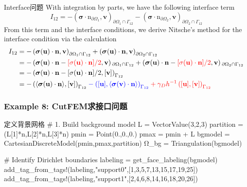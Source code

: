\documentclass[lang=en,aspectratio=43,theme=default,logo=on]{simplebeamer}
\begin{document}
\begin{frame}{Interface问题}
With integration by parts, we have the following interface term
\begin{equation*}
I_{12}=-\left( \bm{\sigma} \cdot \mathrm{n}_{\partial \Omega_1}, \mathbf{v} \right)_{\partial \Omega_1 \cap \Gamma_{12}} - \left( \bm{\sigma} \cdot \mathrm{n}_{\partial \Omega_2}, \mathbf{v} \right)_{\partial \Omega_2 \cap \Gamma_{12}}
\end{equation*}
From this term and the interface conditions, we derive Nitsche’s method for
the interface condition via the calculation
\begin{align*}
    I_{12} &= -\left( \boldsymbol{\sigma}(\mathbf{u}) \cdot \mathbf{n}, \mathbf{v} \right)_{\partial \Omega_1 \cap \Gamma_{12}} + \left( \boldsymbol{\sigma} (\mathbf{u}) \cdot \mathbf{n}, \mathbf{v} \right)_{\partial \Omega_2 \cap \Gamma_{12}}\\
    &= -\left( \boldsymbol{\sigma} (\mathbf{u}) \cdot \mathbf{n} - \color{red}[\sigma(\mathbf{u})\cdot \mathbf{n}]/2 \color{black}, \mathbf{v} \right)_{\partial \Omega_1 \cap \Gamma_{12}} + \left( \boldsymbol{\sigma} (\mathbf{u}) \cdot \mathbf{n} - \color{red} [\sigma(\mathbf{u})\cdot \mathbf{n}]/2 \color{black}, \mathbf{v} \right)_{\partial \Omega_2 \cap \Gamma_{12}}\\
    &=-\left( \boldsymbol{\sigma} (\mathbf{u}) \cdot \mathbf{n} - [\sigma(\mathbf{u})\cdot \mathbf{n}]/2, [\mathbf{v}] \right)_{\Gamma_{12}}\\
    &=-\left( \langle \boldsymbol{\sigma} (\mathbf{u}) \cdot \mathbf{n} \rangle, [\mathbf{v}] \right)_{\Gamma_{12}} \color{blue} -\left( [\mathbf{u}], \langle \boldsymbol{\sigma} (\mathbf{v}) \cdot \mathbf{n} \rangle \right)_{\Gamma_{12}} \color{red} + \gamma_D h^{-1}\left( [\mathbf{u}],  [\mathbf{v}] \right)_{\Gamma_{12}}
\end{align*}
\end{frame}

\begin{frame}[fragile]
    \frametitle{Example 8: CutFEM求接口问题}
\begin{codex}{1}{定义背景网格}
# 1. Build background model
L = VectorValue(3,2,3)
partition = (L[1]*n,L[2]*n,L[3]*n)
pmin = Point(0.,0.,0.)
pmax = pmin + L
bgmodel = CartesianDiscreteModel(pmin,pmax,partition)
Ω_bg = Triangulation(bgmodel)

# Identify Dirichlet boundaries
labeling = get_face_labeling(bgmodel)
add_tag_from_tags!(labeling,"support0",[1,3,5,7,13,15,17,19,25])
add_tag_from_tags!(labeling,"support1",[2,4,6,8,14,16,18,20,26])
\end{codex}
\end{frame}
\end{document}
